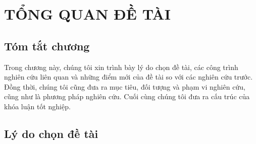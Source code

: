 \chapter{TỔNG QUAN ĐỀ TÀI}\label{Chapter1}

\section*{Tóm tắt chương}

Trong chương này, chúng tôi xin trình bày lý do chọn đề tài, các công trình nghiên cứu liên quan và những điểm mới của đề tài so với các nghiên cứu trước. Đồng thời, chúng tôi cũng đưa ra mục tiêu, đối tượng và phạm vi nghiên cứu, cũng như là phương pháp nghiên cứu. Cuối cùng chúng tôi đưa ra cấu trúc của khóa luận tốt nghiệp.


\section{Lý do chọn đề tài}

